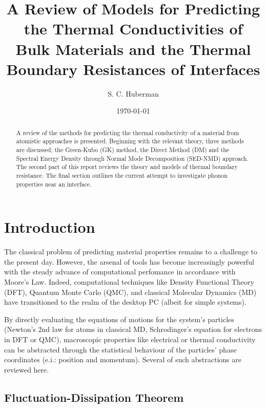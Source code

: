 \documentclass[aps,prb,preprint,preprintnumbers,amsmath,amssymb,floatfix,superscriptaddress]{revtex4}
\begin{document}
\title{A Review of Models for Predicting the Thermal Conductivities of Bulk Materials and the Thermal Boundary Resistances of Interfaces}

\author{S. C. Huberman}

\date{\today}%

\vspace{14mm}    
\begin{abstract}
A review of the methods for predicting the thermal conductivity of a material from atomistic approaches is presented. Beginning with the relevant theory, three methods are discussed; the Green-Kubo (GK) method, the Direct Method (DM) and the Spectral Energy Density through Normal Mode Decomposition (SED-NMD) approach. The second part of this report reviews the theory and models of thermal boundary resistance. The final section outlines the current attempt to investigate phonon properties near an interface.


\end{abstract}
\maketitle

\section*{Introduction}
The classical problem of predicting material properties remains to a challenge to the present day. However, the arsenal of tools has become increasingly powerful with the steady advance of computational perfomance in accordance with Moore's Law. Indeed, computational techniques like Density Functional Theory (DFT), Quantum Monte Carlo (QMC), and classical Molecular Dynamics (MD) have transitioned to the realm of the desktop PC (albeit for simple systems).

By directly evaluating the equations of motions for the system's particles (Newton's 2nd law for atoms in classical MD, Schrodinger's equation for electrons in DFT or QMC), macroscopic properties like electrical or thermal conductivity can be abstracted through the statistical behaviour of the particles' phase coordinates (e.i.: position and momentum). Several of such abstractions are reviewed here.    

\subsection*{Fluctuation-Dissipation Theorem}
\end{document}
